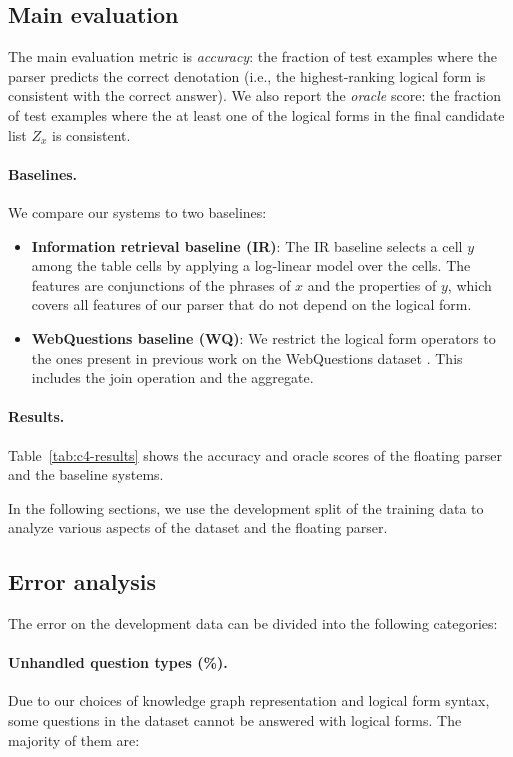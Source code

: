 \subsection{Main evaluation}
The main evaluation metric is \emph{accuracy}:
the fraction of test examples where
the parser predicts the correct denotation
(i.e., the highest-ranking logical form is consistent
with the correct answer).
We also report the \emph{oracle} score:
the fraction of test examples where
the at least one of the logical forms in the
final candidate list $Z_x$ is consistent.

\paragraph{Baselines.}
We compare our systems to two baselines:
\begin{itemize}

\item \textbf{Information retrieval baseline (IR)}:
The IR baseline selects a cell $y$
among the table cells by applying a log-linear model
over the cells.
The features are conjunctions of the phrases of $x$
and the properties of $y$,
which covers all features of our parser
that do not depend on the logical form.

\item \textbf{WebQuestions baseline (WQ)}:
We restrict the logical form operators to the ones
present in previous work on the WebQuestions dataset
\cite{Berant2013SemanticPO}.
This includes the join operation and the  aggregate.
\end{itemize}

\paragraph{Results.}
Table~\ref{tab:c4-results}
shows the accuracy and oracle scores
of the floating parser and the baseline systems.

In the following sections,
we use the development split of the training data
to analyze various aspects of the \wtq dataset
and the floating parser.

\subsection{Error analysis}

The error on the development data can be divided into the
following categories:

\paragraph{Unhandled question types (\qqq\%).}
Due to our choices of knowledge graph representation
and logical form syntax,
some questions in the dataset cannot be answered
with logical forms.
The majority of them are:

